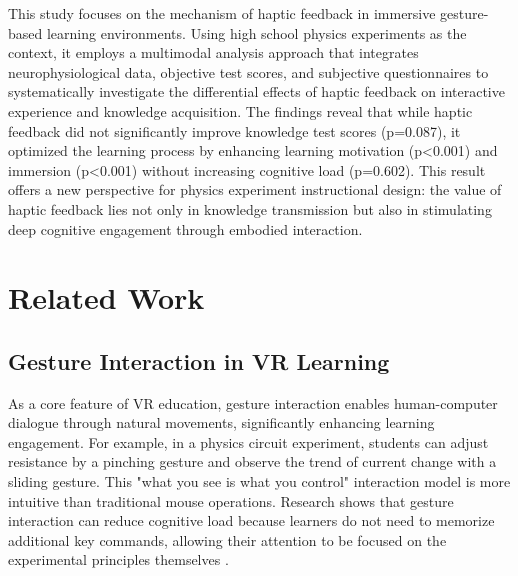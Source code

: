 \documentclass[runningheads]{llncs}
\begin{document}
This study focuses on the mechanism of haptic feedback in immersive gesture-based learning environments. Using high school physics experiments as the context, it employs a multimodal analysis approach that integrates neurophysiological data, objective test scores, and subjective questionnaires to systematically investigate the differential effects of haptic feedback on interactive experience and knowledge acquisition. The findings reveal that while haptic feedback did not significantly improve knowledge test scores (p=0.087), it optimized the learning process by enhancing learning motivation (p<0.001) and immersion (p<0.001) without increasing cognitive load (p=0.602). This result offers a new perspective for physics experiment instructional design: the value of haptic feedback lies not only in knowledge transmission but also in stimulating deep cognitive engagement through embodied interaction.


\section{Related Work}
\subsection{Gesture Interaction in VR Learning} 

As a core feature of VR education, gesture interaction enables human-computer dialogue through natural movements, significantly enhancing learning engagement\cite{johnson2017embodied}. For example, in a physics circuit experiment, students can adjust resistance by a pinching gesture and observe the trend of current change with a sliding gesture. This "what you see is what you control" interaction model is more intuitive than traditional mouse operations\cite{philippe2020multimodal}. Research shows that gesture interaction can reduce cognitive load because learners do not need to memorize additional key commands, allowing their attention to be focused on the experimental principles themselves \cite{hostetter2023comparing}.
\end{document}
